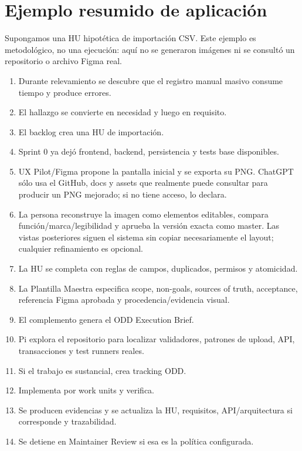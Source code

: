 \documentclass[11pt,a4paper]{article}
\begin{document}
\section{Ejemplo resumido de aplicación}

Supongamos una HU hipotética de importación CSV. Este ejemplo es metodológico, no una ejecución: aquí no se generaron imágenes ni se consultó un repositorio o archivo Figma real.

\begin{enumerate}
    \item Durante relevamiento se descubre que el registro manual masivo consume tiempo y produce errores.
    \item El hallazgo se convierte en necesidad y luego en requisito.
    \item El backlog crea una HU de importación.
    \item Sprint 0 ya dejó frontend, backend, persistencia y tests base disponibles.
    \item UX Pilot/Figma propone la pantalla inicial y se exporta su PNG. ChatGPT sólo usa el GitHub, docs y assets que realmente puede consultar para producir un PNG mejorado; si no tiene acceso, lo declara.
    \item La persona reconstruye la imagen como elementos editables, compara función/marca/legibilidad y aprueba la versión exacta como master. Las vistas posteriores siguen el sistema sin copiar necesariamente el layout; cualquier refinamiento es opcional.
    \item La HU se completa con reglas de campos, duplicados, permisos y atomicidad.
    \item La Plantilla Maestra especifica scope, non-goals, sources of truth, acceptance, referencia Figma aprobada y procedencia/evidencia visual.
    \item El complemento genera el ODD Execution Brief.
    \item Pi explora el repositorio para localizar validadores, patrones de upload, API, transacciones y test runners reales.
    \item Si el trabajo es sustancial, crea tracking ODD.
    \item Implementa por work units y verifica.
    \item Se producen evidencias y se actualiza la HU, requisitos, API/arquitectura si corresponde y trazabilidad.
    \item Se detiene en Maintainer Review si esa es la política configurada.
\end{enumerate}
\end{document}
